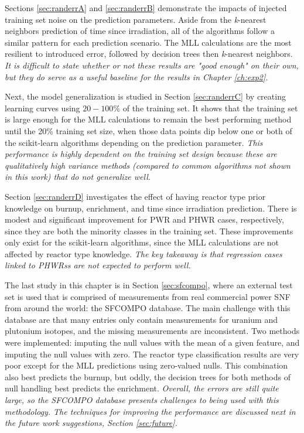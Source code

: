 Sections \ref{sec:randerrA} and \ref{sec:randerrB} demonstrate the impacts of
injected training set noise on the prediction parameters. Aside from the
\textit{k}-nearest neighbors prediction of time since irradiation, all of the
algorithms follow a similar pattern for each prediction scenario.  The
\gls{MLL} calculations are the most resilient to introduced error, followed by
decision trees then \textit{k}-nearest neighbors.  \textit{It is difficult to
state whether or not these results are "good enough" on their own, but they do
serve as a useful baseline for the results in Chapter \ref{ch:exp2}.} 

Next, the model generalization is studied in Section \ref{sec:randerrC} by
creating learning curves using $20-100\%$ of the training set.  It shows that
the training set is large enough for the \gls{MLL} calculations to remain the
best performing method until the 20\% training set size, when those data points
dip below one or both of the scikit-learn algorithms depending on the
prediction parameter.  \textit{This performance is highly dependent on the
training set design because these are qualitatively high variance methods
(compared to common algorithms not shown in this work) that do not generalize
well.}

Section \ref{sec:randerrD} investigates the effect of having reactor type prior
knowledge on burnup, enrichment, and time since irradiation prediction.  There
is modest and significant improvement for \gls{PWR} and \gls{PHWR} cases,
respectively, since they are both the minority classes in the training set.
These improvements only exist for the scikit-learn algorithms, since the
\gls{MLL} calculations are not affected by reactor type knowledge. \textit{The
key takeaway is that regression cases linked to \glspl{PHWR}s are not expected
to perform well.}

The last study in this chapter is in Section \ref{sec:sfcompo}, where an
external test set is used that is comprised of measurements from real
commercial power \gls{SNF} from around the world: the \gls{SFCOMPO} database.
The main challenge with this database are that many entries only contain
measurements for uranium and plutonium isotopes, and the missing measurements
are inconsistent. Two methods were implemented: imputing the null values with
the mean of a given feature, and imputing the null values with zero.  The
reactor type classification results are very poor except for the \gls{MLL}
predictions using zero-valued nulls.  This combination also best predicts the
burnup, but oddly, the decision trees for both methods of null handling best
predicts the enrichment.  \textit{Overall, the errors are still quite large, so
the \gls{SFCOMPO} database presents challenges to being used with this
methodology. The techniques for improving the performance are discussed next in
the future work suggestions, Section \ref{sec:future}.}

